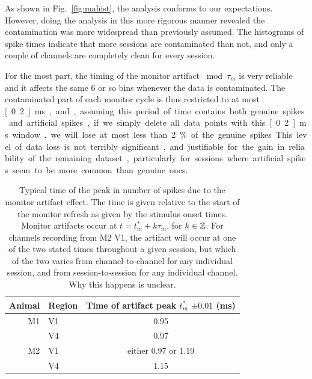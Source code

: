 
As shown in Fig.~\ref{fig:mahist}, the analysis conforms to our expectations.
However, doing the analysis in this more rigorous manner revealed the contamination was more widespread than previously assumed.
The histograms of spike times indicate that more sessions are contaminated than not, and only a couple of channels are completely clean for every session.

For the most part, the timing of the monitor artifact $\bmod \tau_m$ is very reliable and it affects the same 6 or so bins whenever the data is contaminated.
The contaminated part of each monitor cycle is thus restricted to at most \unit[0.2]{ms}, and, assuming this period of time contains both genuine spikes and artificial spikes, if we simply delete all data points with this \unit[0.2]{ms} window, we will lose at most less than 2\% of the genuine spikes.
This level of data loss is not terribly significant, and justifiable for the gain in reliability of the remaining dataset, particularly for sessions where artificial spikes seem to be more common than genuine ones.

\begin{table}[hbtp]
\caption{Typical time of the peak in number of spikes due to the monitor artifact effect.
The time is given relative to the start of the monitor refresh as given by the stimulus onset times.
Monitor artifacts occur at $t = t^*_m + k \tau_m$, for $k \in \mathbb{Z}$.
For channels recording from \ac{M2} \ac{V1}, the artifact will occur at one of the two stated times throughout a given session, but which of the two varies from channel-to-channel for any individual session, and from session-to-session for any individual channel.
Why this happens is unclear.}
\label{tab:mapeak}
\begin{center}
\begin{tabular}{rlc}
\toprule
Animal  & Region & Time of artifact peak $t^*_m$ $\pm 0.01$ (\unit{ms})
\\
\midrule
M1  & V1    & 0.95
\\
        & V4    & 0.97
\\
M2    & V1    & either 0.97 or 1.19
\\
        & V4    & 1.15
\\
\bottomrule
\end{tabular}
\end{center}
\end{table}


